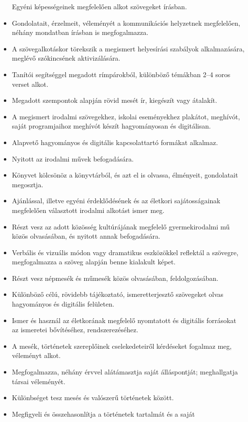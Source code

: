 \begin{itemize}
  Egyéni képességeinek megfelelően alkot szövegeket írásban.
\item
  Gondolatait, érzelmeit, véleményét a kommunikációs helyzetnek
  megfelelően, néhány mondatban írásban is megfogalmazza.
\item
  A szövegalkotáskor törekszik a megismert helyesírási szabályok
  alkalmazására, meglévő szókincsének aktivizálására.
\item
  Tanítói segítséggel megadott rímpárokból, különböző témákban 2--4
  soros verset alkot.
\item
  Megadott szempontok alapján rövid mesét ír, kiegészít vagy átalakít.
\item
  A megismert irodalmi szövegekhez, iskolai eseményekhez plakátot,
  meghívót, saját programjaihoz meghívót készít hagyományosan és
  digitálisan.
\item
  Alapvető hagyományos és digitális kapcsolattartó formákat alkalmaz.
\item
  Nyitott az irodalmi művek befogadására.
\item
  Könyvet kölcsönöz a könyvtárból, és azt el is olvassa, élményeit,
  gondolatait megosztja.
\item
  Ajánlással, illetve egyéni érdeklődésének és az életkori
  sajátosságainak megfelelően választott irodalmi alkotást ismer meg.
\item
  Részt vesz az adott közösség kultúrájának megfelelő gyermekirodalmi mű
  közös olvasásában, és nyitott annak befogadására.
\item
  Verbális és vizuális módon vagy dramatikus eszközökkel reflektál a
  szövegre, megfogalmazza a szöveg alapján benne kialakult képet.
\item
  Részt vesz népmesék és műmesék közös olvasásában, feldolgozásában.
\item
  Különböző célú, rövidebb tájékoztató, ismeretterjesztő szövegeket
  olvas hagyományos és digitális felületen.
\item
  Ismer és használ az életkorának megfelelő nyomtatott és digitális
  forrásokat az ismeretei bővítéséhez, rendszerezéséhez.
\item
  A mesék, történetek szereplőinek cselekedeteiről kérdéseket fogalmaz
  meg, véleményt alkot.
\item
  Megfogalmazza, néhány érvvel alátámasztja saját álláspontját;
  meghallgatja társai véleményét.
\item
  Különbséget tesz mesés és valószerű történetek között.
\item
  Megfigyeli és összehasonlítja a történetek tartalmát és a saját

\end{itemize}
